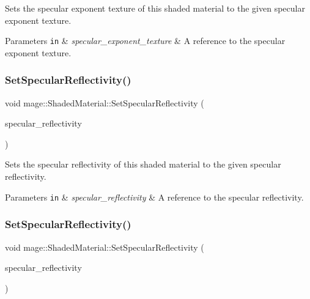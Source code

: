 Sets the specular exponent texture of this shaded material to the given specular exponent texture.


\begin{DoxyParams}[1]{Parameters}
\mbox{\tt in}  & {\em specular\+\_\+exponent\+\_\+texture} & A reference to the specular exponent texture. \\
\hline
\end{DoxyParams}
\hypertarget{structmage_1_1_shaded_material_aa31a28ef31f98adf3ccf1fa83e6db9fb}{}\label{structmage_1_1_shaded_material_aa31a28ef31f98adf3ccf1fa83e6db9fb} 
\subsubsection{\texorpdfstring{Set\+Specular\+Reflectivity()}{SetSpecularReflectivity()}\hspace{0.1cm}{\footnotesize\ttfamily [1/2]}}
{\footnotesize\ttfamily void mage\+::\+Shaded\+Material\+::\+Set\+Specular\+Reflectivity (\begin{DoxyParamCaption}\item[{const \hyperlink{structmage_1_1_r_g_b_spectrum}{R\+G\+B\+Spectrum} \&}]{specular\+\_\+reflectivity }\end{DoxyParamCaption})\hspace{0.3cm}{\ttfamily [noexcept]}}

Sets the specular reflectivity of this shaded material to the given specular reflectivity.


\begin{DoxyParams}[1]{Parameters}
\mbox{\tt in}  & {\em specular\+\_\+reflectivity} & A reference to the specular reflectivity. \\
\hline
\end{DoxyParams}
\hypertarget{structmage_1_1_shaded_material_acfe55ee6398b1255d48d7e72a543f127}{}\label{structmage_1_1_shaded_material_acfe55ee6398b1255d48d7e72a543f127} 
\subsubsection{\texorpdfstring{Set\+Specular\+Reflectivity()}{SetSpecularReflectivity()}\hspace{0.1cm}{\footnotesize\ttfamily [2/2]}}
{\footnotesize\ttfamily void mage\+::\+Shaded\+Material\+::\+Set\+Specular\+Reflectivity (\begin{DoxyParamCaption}\item[{\hyperlink{structmage_1_1_r_g_b_spectrum}{R\+G\+B\+Spectrum} \&\&}]{specular\+\_\+reflectivity }\end{DoxyParamCaption})\hspace{0.3cm}{\ttfamily [noexcept]}}

